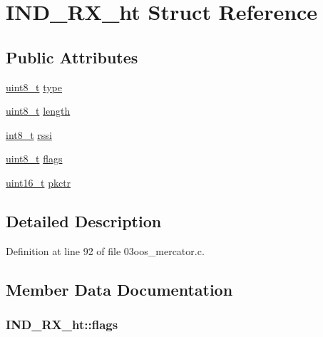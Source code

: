\hypertarget{struct_i_n_d___r_x__ht}{}\section{I\+N\+D\+\_\+\+R\+X\+\_\+ht Struct Reference}
\label{struct_i_n_d___r_x__ht}
\subsection*{Public Attributes}
\begin{DoxyCompactItemize}
\item 
\hyperlink{_p_e___types_8h_aba7bc1797add20fe3efdf37ced1182c5}{uint8\+\_\+t} \hyperlink{struct_i_n_d___r_x__ht_a521849db4071f512108fc18d5910b65b}{type}
\item 
\hyperlink{_p_e___types_8h_aba7bc1797add20fe3efdf37ced1182c5}{uint8\+\_\+t} \hyperlink{struct_i_n_d___r_x__ht_af9d4cd2597943520f639acdd5b02afa7}{length}
\item 
\hyperlink{_p_e___types_8h_aef44329758059c91c76d334e8fc09700}{int8\+\_\+t} \hyperlink{struct_i_n_d___r_x__ht_ae0b8433651b81cc26fd48e07b7a941c2}{rssi}
\item 
\hyperlink{_p_e___types_8h_aba7bc1797add20fe3efdf37ced1182c5}{uint8\+\_\+t} \hyperlink{struct_i_n_d___r_x__ht_a092c6cc9b5f1cad037d45ee65347c399}{flags}
\item 
\hyperlink{_p_e___types_8h_a1f1825b69244eb3ad2c7165ddc99c956}{uint16\+\_\+t} \hyperlink{struct_i_n_d___r_x__ht_ab6378f63555f46485d589b3370caa776}{pkctr}
\end{DoxyCompactItemize}


\subsection{Detailed Description}


Definition at line 92 of file 03oos\+\_\+mercator.\+c.



\subsection{Member Data Documentation}
\subsubsection[{\texorpdfstring{flags}{flags}}]{ I\+N\+D\+\_\+\+R\+X\+\_\+ht\+::flags}\hypertarget{struct_i_n_d___r_x__ht_a092c6cc9b5f1cad037d45ee65347c399}{}\label{struct_i_n_d___r_x__ht_a092c6cc9b5f1cad037d45ee65347c399}


